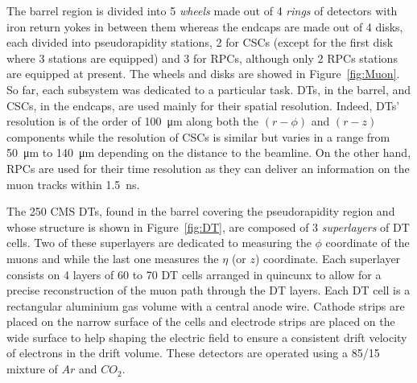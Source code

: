 	The barrel region is divided into 5 \textit{wheels} made out of 4 \textit{rings} of detectors with iron return yokes in between them whereas the endcaps are made out of 4 disks, each divided into pseudorapidity stations, 2 for CSCs (except for the first disk where 3 stations are equipped) and 3 for RPCs, although only 2 RPCs stations are equipped at present. The wheels and disks are showed in Figure~\ref{fig:Muon}. So far, each subsystem was dedicated to a particular task. DTs, in the barrel, and CSCs, in the endcaps, are used mainly for their spatial resolution. Indeed, DTs' resolution is of the order of \SI{100}{\micro m} along both the $(r-\phi)$ and $(r-z)$ components while the resolution of CSCs is similar but varies in a range from \SI{50}{\micro m} to \SI{140}{\micro m} depending on the distance to the beamline. On the other hand, RPCs are used for their time resolution as they can deliver an information on the muon tracks within \SI{1.5}{ns}.
	
	The 250 CMS DTs, found in the barrel covering the pseudorapidity region  and whose structure is shown in Figure~\ref{fig:DT}, are composed of 3 \textit{superlayers} of DT cells. Two of these superlayers are dedicated to measuring the $\phi$ coordinate of the muons and while the last one measures the $\eta$ (or $z$) coordinate. Each superlayer consists on 4 layers of 60 to 70 DT cells arranged in quincunx to allow for a precise reconstruction of the muon path through the DT layers. Each DT cell is a rectangular aluminium gas volume with a central anode wire. Cathode strips are placed on the narrow surface of the cells and electrode strips are placed on the wide surface to help shaping the electric field to ensure a consistent drift velocity of electrons in the drift volume. These detectors are operated using a 85/15 mixture of $Ar$ and $CO_2$.
	
